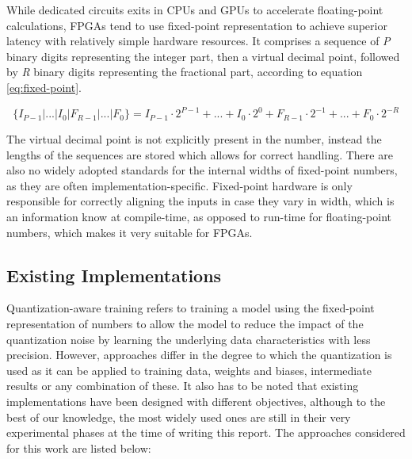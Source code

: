 While dedicated circuits exits in CPUs and GPUs to accelerate floating-point calculations, FPGAs tend to use fixed-point representation to achieve superior latency with relatively simple hardware resources. It comprises a sequence of \textit{P} binary digits representing the integer part, then a virtual decimal point, followed by \textit{R} binary digits representing the fractional part, according to equation \ref{eq:fixed-point}.

\begin{equation}\label{eq:fixed-point}
  \{ I_{P-1} | ... | I_0 | F_{R-1} | ... | F_0 \} = I_{P-1} \cdot 2^{P-1} + ... + I_{0} \cdot 2^{0} + F_{R-1} \cdot 2^{-1} + ... + F_{0} \cdot 2^{-R}
\end{equation}

The virtual decimal point is not explicitly present in the number, instead the lengths of the sequences are stored which allows for correct handling. There are also no widely adopted standards for the internal widths of fixed-point numbers, as they are often implementation-specific. Fixed-point hardware is only responsible for correctly aligning the inputs in case they vary in width, which is an information know at compile-time, as opposed to run-time for floating-point numbers, which makes it very suitable for FPGAs.

\subsection{Existing Implementations}
Quantization-aware training refers to training a model using the fixed-point representation of numbers to allow the model to reduce the impact of the quantization noise by learning the underlying data characteristics with less precision. However, approaches differ in the degree to which the quantization is used as it can be applied to training data, weights and biases, intermediate results or any combination of these. It also has to be noted that existing implementations have been designed with different objectives, although to the best of our knowledge, the most widely used ones are still in their very experimental phases at the time of writing this report. The approaches considered for this work are listed below:

